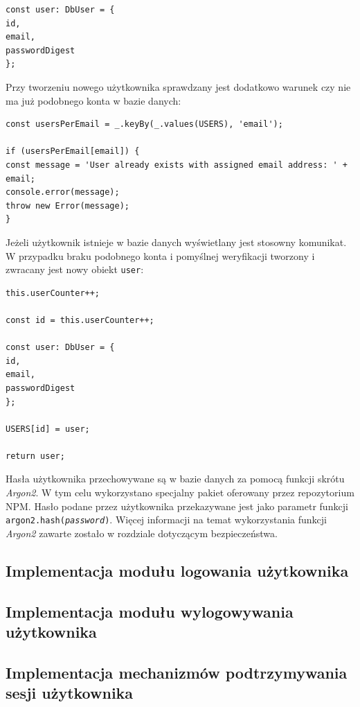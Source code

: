 \begin{verbatim}
const user: DbUser = {
id,
email,
passwordDigest
};
\end{verbatim}

Przy tworzeniu nowego użytkownika sprawdzany jest dodatkowo warunek czy nie ma już podobnego konta w bazie danych:

\begin{verbatim}
const usersPerEmail = _.keyBy(_.values(USERS), 'email');

if (usersPerEmail[email]) {
const message = 'User already exists with assigned email address: ' + email;
console.error(message);
throw new Error(message);
}
\end{verbatim}

Jeżeli użytkownik istnieje w bazie danych wyświetlany jest stosowny komunikat. W przypadku braku podobnego konta i pomyślnej weryfikacji tworzony i zwracany jest nowy obiekt \texttt{user}:

\begin{verbatim}
this.userCounter++;

const id = this.userCounter++;

const user: DbUser = {
id,
email,
passwordDigest
};

USERS[id] = user;

return user;
\end{verbatim}

Hasła użytkownika przechowywane są w bazie danych za pomocą funkcji skrótu \textit{Argon2}. W tym celu wykorzystano specjalny pakiet oferowany przez repozytorium NPM. Hasło podane przez użytkownika przekazywane jest jako parametr funkcji \texttt{argon2.hash(\textit{password})}. Więcej informacji na temat wykorzystania funkcji \textit{Argon2} zawarte zostało w rozdziale dotyczącym bezpieczeństwa. 

\subsection{Implementacja modułu logowania użytkownika}

\subsection{Implementacja modułu wylogowywania użytkownika}

\subsection{Implementacja mechanizmów podtrzymywania sesji użytkownika}
